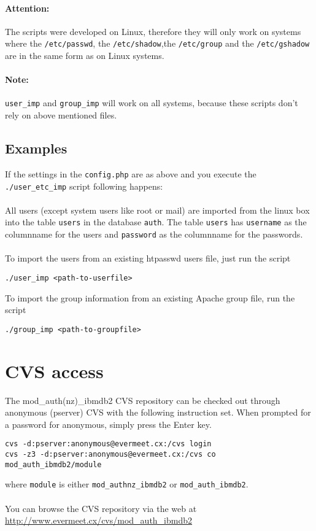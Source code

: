 \documentclass[11pt,a4paper]{article}
\begin{document}
\paragraph{Attention:}{The scripts were developed on Linux, therefore they will only work on systems where the {\tt /etc/passwd}, the {\tt /etc/shadow},the {\tt /etc/group} and the {\tt /etc/gshadow} are in the same form as on Linux systems.}
\paragraph{Note:}{{\tt user\_imp} and {\tt group\_imp} will work on all systems, because these scripts don't rely on above mentioned files.}
\subsection{Examples}
If the settings in the {\tt config.php} are as above and you execute the {\tt ./user\_etc\_imp} script following happens:\\
\\
All users (except system users like root or mail) are imported from the linux box into the table {\tt users} in the database {\tt auth}.
The table {\tt users} has {\tt username} as the columnname for the users and {\tt password} as the columnname for the passwords.\\
\\
To import the users from an existing htpasswd users file, just run the script
\begin{verbatim}
./user_imp <path-to-userfile>
\end{verbatim}
To import the group information from an existing Apache group file, run the script
\begin{verbatim}
./group_imp <path-to-groupfile>
\end{verbatim}
\newpage

\section{CVS access}
The mod\_auth(nz)\_ibmdb2 CVS repository can be checked out through anonymous (pserver) CVS with the following instruction set. When prompted for a password for anonymous, simply press the Enter key.
\begin{verbatim}
cvs -d:pserver:anonymous@evermeet.cx:/cvs login
cvs -z3 -d:pserver:anonymous@evermeet.cx:/cvs co mod_auth_ibmdb2/module
\end{verbatim}
where {\tt module} is either {\tt mod\_authnz\_ibmdb2} or {\tt mod\_auth\_ibmdb2}.\\
\\
You can browse the CVS repository via the web at\\
\url{http://www.evermeet.cx/cvs/mod_auth_ibmdb2}
\newpage
\end{document}

